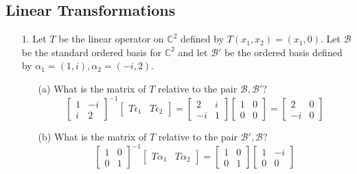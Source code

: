 \documentclass{article}
\begin{document}
\subsection{Linear Transformations}
\begin{enumerate}[listparindent=\parindent]

\item[1.] Let \(T\) be the linear operator on \(\mathbb{C}^2\) defined by \(T(x_1, x_2) = (x_1, 0)\).
    Let \(\mathcal{B}\) be the standard ordered basis for \(\mathbb{C}^2\)
    and let \(\mathcal{B}'\) be the ordered basis defined by \(\alpha_1 = (1, i), \alpha_2 = (-i, 2)\).
    \begin{enumerate}[listparindent=\parindent]
        \item[(a)] What is the matrix of \(T\) relative to the pair \(\mathcal{B}, \mathcal{B}'\)?
            \[
                \begin{bmatrix} 1 & -i \\ i & 2 \end{bmatrix}^{-1}
                \begin{bmatrix} T\epsilon_1 & T\epsilon_2 \end{bmatrix}
                =
                \begin{bmatrix} 2 & i \\ -i & 1 \end{bmatrix}
                \begin{bmatrix} 1 & 0 \\ 0 & 0 \end{bmatrix}
                =
                \begin{bmatrix} 2 & 0 \\ -i & 0 \end{bmatrix}
            \]
        \item[(b)] What is the matrix of \(T\) relative to the pair \(\mathcal{B}', \mathcal{B}\)?
            \[
                \begin{bmatrix} 1 & 0 \\ 0 & 1 \end{bmatrix}^{-1}
                \begin{bmatrix} T\alpha_1 & T\alpha_2 \end{bmatrix}
                =
                \begin{bmatrix} 1 & 0 \\ 0 & 1 \end{bmatrix}
                \begin{bmatrix} 1 & -i \\ 0 & 0 \end{bmatrix}
\]
\end{enumerate}
\end{enumerate}
\end{document}
